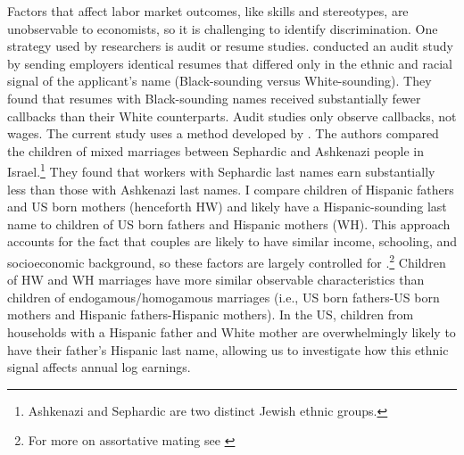 Factors that affect labor market outcomes, like skills and stereotypes, are unobservable to economists, so it is challenging to identify discrimination. One strategy used by researchers is audit or resume studies. \textcite{bertrand2004emily} conducted an audit study by sending employers identical resumes that differed only in the ethnic and racial signal of the applicant’s name (Black-sounding versus White-sounding). They found that resumes with Black-sounding names received substantially fewer callbacks than their White counterparts. Audit studies only observe callbacks, not wages. The  current study uses a method developed by \textcite{rubinstein2014pride}. The authors compared the children of mixed marriages between Sephardic and Ashkenazi people in Israel.\footnote{Ashkenazi and Sephardic are two distinct Jewish ethnic groups.} They found that workers with Sephardic last names earn substantially less than those with Ashkenazi last names. I compare children of Hispanic fathers and US born mothers (henceforth HW) and likely have a Hispanic-sounding last name to children of US born fathers and Hispanic mothers (WH). This approach accounts for the fact that  couples are likely to have similar income, schooling, and socioeconomic background, so these factors are largely controlled for \autocite{averettBetterWorseRelationship2008, averettEconomicRealityBeauty1996}.\footnote{For more on assortative mating see \autocite{beckerTheoryMarriagePart1973, beckerTheoryMarriagePart1974, beckerTreatiseFamily1993, browningCollectiveUnitaryModels2006, chiapporiFatterAttractionAnthropometric2012}} Children of HW and WH marriages have more similar observable characteristics than children of endogamous/homogamous marriages (i.e., US born fathers-US born mothers and Hispanic fathers-Hispanic mothers). In the US, children  from households with a Hispanic father and White mother  are overwhelmingly likely to  have their father’s Hispanic last name, allowing us to investigate how this ethnic signal affects annual log earnings.

